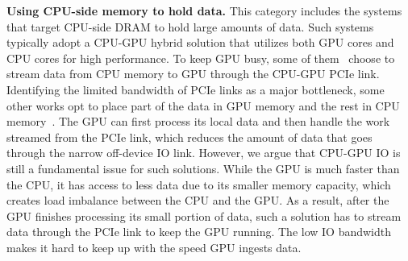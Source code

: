 \begin{comment}
The high-bandwidth GPU interconnects allow treating the memory in multiple GPUs as a big memory pool, and we can thus scale the amount of memory each GPU has access to horizontally.
However, it is not a perfect solution because we have to accept the bundled GPU compute resources while capacity is the main problem, resulting in higher total costs.
Plus, there is a limit to the maximum number of cards each node can support, usually 8, so the aggregated memory capacity is still far less than what the CPU can have.
\end{comment}

\noindent
\textbf{Using CPU-side memory to hold data.}
This category includes the systems that target CPU-side DRAM to hold large amounts of data. 
Such systems typically adopt a CPU-GPU hybrid solution that utilizes both GPU cores and CPU cores for high performance.
To keep GPU busy, some of them~\cite{hetexchange-vldb-2019, HERO-VLDB-2017, GDB-TDBSys-2009}
choose to stream data from CPU memory to GPU through the CPU-GPU PCIe link.
Identifying the limited bandwidth of PCIe links as a major bottleneck, some other works opt to place part of the data in GPU memory and the rest in CPU memory~\cite{mordered-vldb-2022, Ocelot-VLDB-2014, Ocelet-VLDB-2013}.
The GPU can first process its local data and then handle the work streamed from the PCIe link, which reduces the amount of data that goes through the narrow off-device IO link.
However, we argue that CPU-GPU IO is still a fundamental issue for such solutions.
While the GPU is much faster than the CPU, it has access to less data due to its smaller memory capacity, which creates load imbalance between the CPU and the GPU.
As a result, after the GPU finishes processing its small portion of data, such a solution has to stream data through the PCIe link to keep the GPU running. 
The low IO bandwidth makes it hard to keep up with the speed GPU ingests data.









